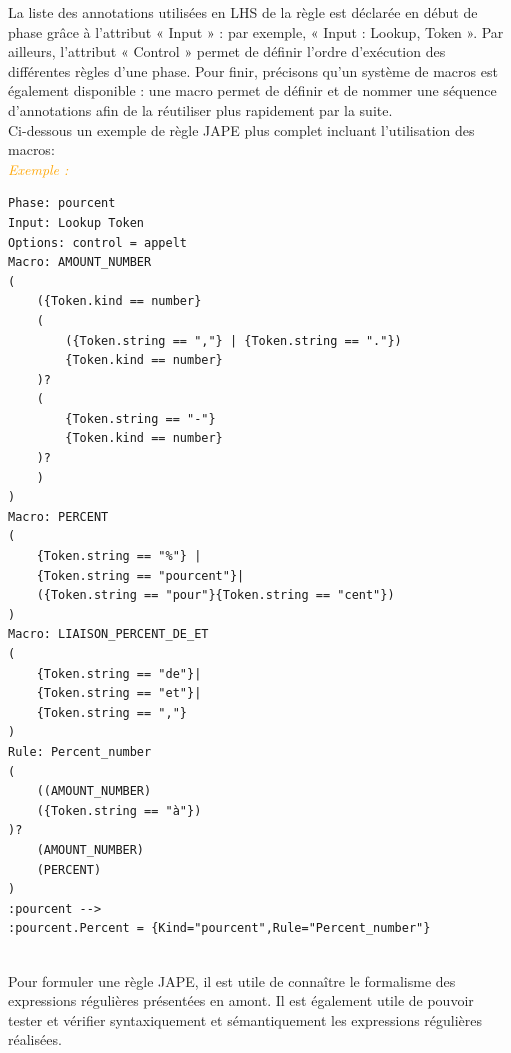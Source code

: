 \documentclass[a4paper, 11pt]{report}
\newenvironment{exemple}
    {
    \textit{\textcolor{orange}{
    Exemple : \\}}
    }
    {
    ~\\
    }
\begin{document}
La liste des annotations utilisées en LHS de la règle est déclarée en début de phase grâce à l'attribut « Input » : par exemple, « Input : Lookup, Token ». Par ailleurs, l'attribut « Control » permet de définir l'ordre d'exécution des différentes règles d'une phase.
Pour finir, précisons qu'un système de macros est également disponible : une macro permet
de définir et de nommer une séquence d'annotations afin de la réutiliser plus rapidement par la suite.~\cite{SL10}\\
Ci-dessous un exemple de règle JAPE plus complet incluant l'utilisation des macros:\\
\begin{exemple}
\begin{verbatim}
Phase: pourcent
Input: Lookup Token
Options: control = appelt
Macro: AMOUNT_NUMBER
(
    ({Token.kind == number}
    (
        ({Token.string == ","} | {Token.string == "."})
        {Token.kind == number}
    )?
    (
        {Token.string == "-"}
        {Token.kind == number}
    )?
    )
)
Macro: PERCENT
(
    {Token.string == "%"} |
    {Token.string == "pourcent"}|
    ({Token.string == "pour"}{Token.string == "cent"})
)
Macro: LIAISON_PERCENT_DE_ET
(
    {Token.string == "de"}|
    {Token.string == "et"}|
    {Token.string == ","}
)
Rule: Percent_number
(
    ((AMOUNT_NUMBER)
    ({Token.string == "à"})
)?
    (AMOUNT_NUMBER)
    (PERCENT)
)
:pourcent -->
:pourcent.Percent = {Kind="pourcent",Rule="Percent_number"}
\end{verbatim}
\end{exemple}
Pour formuler une règle JAPE, il est utile de connaître le formalisme des expressions régulières présentées en amont. Il est également utile de pouvoir tester et vérifier syntaxiquement et sémantiquement les expressions régulières réalisées.
\newpage
\end{document}
